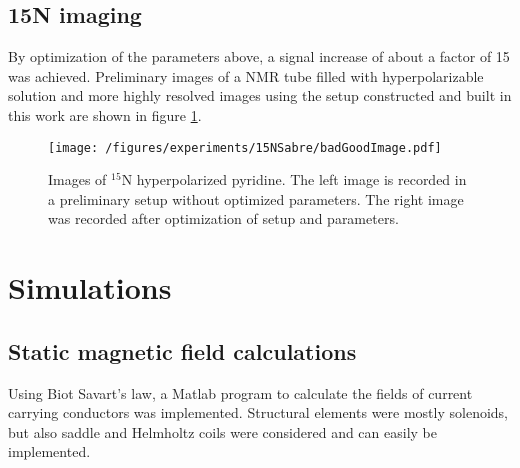         \subsection{15N imaging}
        By optimization of the parameters above, a signal increase of about a factor of 15 was achieved. Preliminary images of a NMR tube filled with hyperpolarizable solution and more highly resolved images using the setup constructed and built in this work are shown in figure \ref{fig:results:15Nimage}.
        \begin{figure}
            \texttt{[image: /figures/experiments/15NSabre/badGoodImage.pdf]}
            \caption[15N image]{Images of $^{15}$N hyperpolarized pyridine. The left image is recorded in a preliminary setup without optimized parameters. The right image was recorded after optimization of setup and parameters.}
            \label{fig:results:15Nimage}

        \end{figure}
\section{Simulations}
        \label{sec:results:sim}
        \subsection{Static magnetic field calculations}
        \label{sec:results:sim:B0}
            Using Biot Savart's law, a Matlab program to calculate the fields of current carrying conductors was implemented. Structural elements were mostly solenoids, but also saddle and Helmholtz coils were considered and can easily be implemented.
